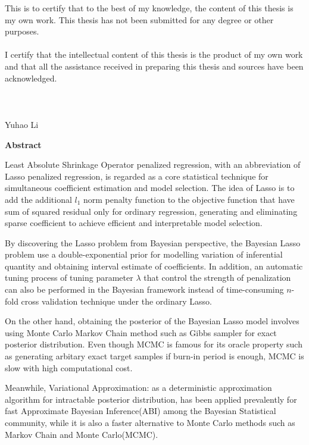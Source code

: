 \noindent This is to certify that to the best of my knowledge, the content of this thesis is my own work. This thesis has not been submitted for any degree or other purposes.\\
\\
\noindent I certify that the intellectual content of this thesis is the product of my own work and that all the assistance received in preparing this thesis and sources have been acknowledged.\\
\\
\\
\\
Yuhao Li

\pagebreak
\hspace{0pt}

\begin{center}
    \textbf{\large Abstract }\\
    \vspace{0.5cm}
\end{center}
Least Absolute Shrinkage Operator penalized regression, with an abbreviation of Lasso penalized regression, is regarded as a core statistical technique for simultaneous coefficient estimation and model selection. The idea of Lasso is to add the additional $l_1$ norm penalty function to the objective function that have sum of squared residual only for ordinary regression, generating and eliminating sparse coefficient to achieve efficient and interpretable model selection.

By discovering the Lasso problem from Bayesian perspective, the Bayesian Lasso problem use a double-exponential prior for modelling variation of inferential quantity and obtaining interval estimate of coefficients. In addition, an automatic tuning process of tuning parameter $\lambda$ that control the strength of penalization can also be performed in the Bayesian framework instead of time-consuming $n$-fold cross validation technique under the ordinary Lasso.

On the other hand, obtaining the posterior of the Bayesian Lasso model involves using Monte Carlo Markov Chain method such as Gibbs sampler for exact posterior distribution. Even though MCMC is famous for its oracle property such as generating arbitary exact target samples if burn-in period is enough, MCMC is slow with high computational cost. 

Meanwhile, Variational Approximation: as a deterministic approximation algorithm for intractable posterior distribution, has been applied prevalently for fast Approximate Bayesian Inference(ABI) among the Bayesian Statistical community, while it is also a faster alternative to Monte Carlo methods such as Markov Chain and Monte Carlo(MCMC).

